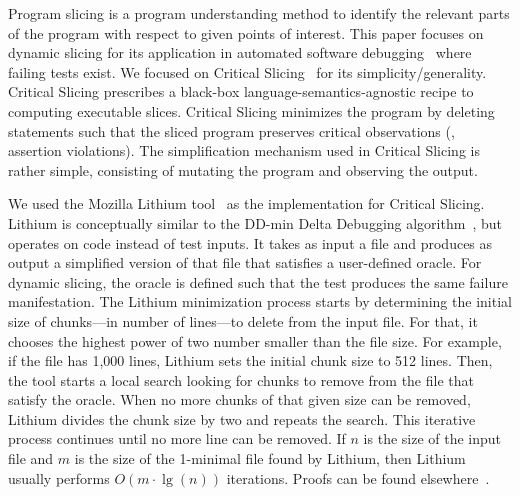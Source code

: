 \documentclass[sigplan,10pt,review,anonymous]{acmart}\settopmatter{printfolios=true,printccs=false,printacmref=false}
\begin{document}

Program slicing is a program understanding method to identify the
relevant parts of the program with respect to given points of
interest.  This paper focuses on dynamic slicing
for its application in automated software
debugging~\cite{Binkley:2014:OLP:2635868.2635893} where failing tests
exist. We focused on Critical
Slicing~\cite{DeMillo:1996:CSS:229000.226310} for its
simplicity/generality. Critical Slicing
prescribes a black-box language-semantics-agnostic recipe to computing
executable slices.  Critical Slicing minimizes the program by deleting
statements such that the sliced program preserves critical
observations (\eg{}, assertion violations). The simplification
mechanism used in Critical Slicing is rather simple, consisting of
mutating the program and observing the output.

We used the Mozilla Lithium tool~\cite{lithium} as the implementation
for Critical Slicing. Lithium is conceptually similar to the DD-min
Delta Debugging algorithm~\cite{zeller-hildebrandt-tse2002}, but
operates on code instead of test inputs. It takes as input a file and
produces as output a simplified version of that file that satisfies a
user-defined oracle. For dynamic slicing, the oracle is defined such
that the test produces the same failure manifestation. The Lithium
minimization process starts by determining the initial size of
chunks---in number of lines---to delete from the input file. For that,
it chooses the highest power of two number smaller than the file
size. For example, if the file has 1,000 lines, Lithium sets the
initial chunk size to 512 lines. Then, the tool starts a local search
looking for chunks to remove from the file that satisfy the
oracle. When no more chunks of that given size can be removed, Lithium
divides the chunk size by two and repeats the search. This iterative
process continues until no more line can be removed.  If $n$ is the
size of the input file and $m$ is the size of the 1-minimal file found
by Lithium, then Lithium usually performs $O(m\cdot\lg(n))$
iterations. Proofs can be found elsewhere~\cite{lithium-complexity}.
\end{document}
